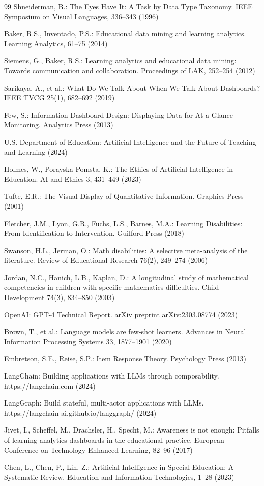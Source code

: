 \documentclass[11pt]{article}
\begin{document}
\begin{thebibliography}{99}
Shneiderman, B.: The Eyes Have It: A Task by Data Type Taxonomy. IEEE Symposium on Visual Languages, 336--343 (1996)

Baker, R.S., Inventado, P.S.: Educational data mining and learning analytics. Learning Analytics, 61--75 (2014)

Siemens, G., Baker, R.S.: Learning analytics and educational data mining: Towards communication and collaboration. Proceedings of LAK, 252--254 (2012)

Sarikaya, A., et al.: What Do We Talk About When We Talk About Dashboards? IEEE TVCG 25(1), 682--692 (2019)

Few, S.: Information Dashboard Design: Displaying Data for At-a-Glance Monitoring. Analytics Press (2013)

U.S. Department of Education: Artificial Intelligence and the Future of Teaching and Learning (2024)

Holmes, W., Porayska-Pomsta, K.: The Ethics of Artificial Intelligence in Education. AI and Ethics 3, 431--449 (2023)

Tufte, E.R.: The Visual Display of Quantitative Information. Graphics Press (2001)

Fletcher, J.M., Lyon, G.R., Fuchs, L.S., Barnes, M.A.: Learning Disabilities: From Identification to Intervention. Guilford Press (2018)

Swanson, H.L., Jerman, O.: Math disabilities: A selective meta-analysis of the literature. Review of Educational Research 76(2), 249--274 (2006)

Jordan, N.C., Hanich, L.B., Kaplan, D.: A longitudinal study of mathematical competencies in children with specific mathematics difficulties. Child Development 74(3), 834--850 (2003)

OpenAI: GPT-4 Technical Report. arXiv preprint arXiv:2303.08774 (2023)

Brown, T., et al.: Language models are few-shot learners. Advances in Neural Information Processing Systems 33, 1877--1901 (2020)

Embretson, S.E., Reise, S.P.: Item Response Theory. Psychology Press (2013)

LangChain: Building applications with LLMs through composability. https://langchain.com (2024)

LangGraph: Build stateful, multi-actor applications with LLMs. https://langchain-ai.github.io/langgraph/ (2024)

Jivet, I., Scheffel, M., Drachsler, H., Specht, M.: Awareness is not enough: Pitfalls of learning analytics dashboards in the educational practice. European Conference on Technology Enhanced Learning, 82--96 (2017)

Chen, L., Chen, P., Lin, Z.: Artificial Intelligence in Special Education: A Systematic Review. Education and Information Technologies, 1--28 (2023)

\end{thebibliography}
\end{document}
